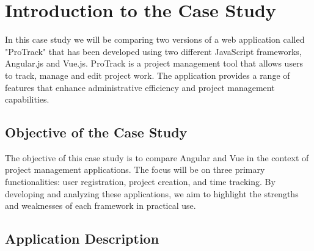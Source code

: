 




\section{Introduction to the Case Study}
In this case study we will be comparing two versions of a web application called "ProTrack" that has been developed using two different JavaScript frameworks, Angular.js and Vue.js. ProTrack is a project management tool that allows users to track, manage and edit project work. The application provides a range of features that enhance administrative efficiency and project management capabilities.
\subsection{Objective of the Case Study}
The objective of this case study is to compare Angular and Vue in the context of project management applications. The focus will be on three primary functionalities: user registration, project creation, and time tracking. By developing and analyzing these applications, we aim to highlight the strengths and weaknesses of each framework in practical use.
\subsection{Application Description}
